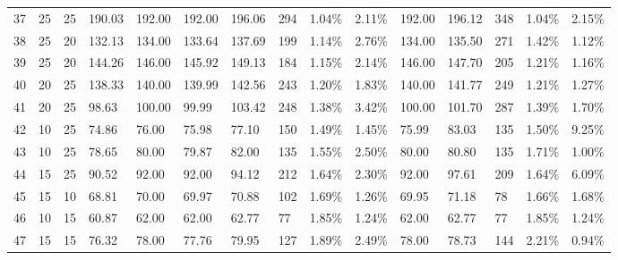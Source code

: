 \documentclass[
  a4paper,
,tablecaptionabove
]{scrartcl}
\begin{document}
\begin{longtable}{l|ll|ll|lllll|lllll}
  37 & 25                         & 25                         & 190.03                    & 192.00      & 192.00        & 196.06 & 294 & 1.04\%  & 2.11\% & 192.00 & 196.12 & 348 & 1.04\%  & 2.15\%  \\
  38 & 25                         & 20                         & 132.13                    & 134.00      & 133.64        & 137.69 & 199 & 1.14\%  & 2.76\% & 134.00 & 135.50 & 271 & 1.42\%  & 1.12\%  \\
  39 & 25                         & 20                         & 144.26                    & 146.00      & 145.92        & 149.13 & 184 & 1.15\%  & 2.14\% & 146.00 & 147.70 & 205 & 1.21\%  & 1.16\%  \\
  40 & 20                         & 25                         & 138.33                    & 140.00      & 139.99        & 142.56 & 243 & 1.20\%  & 1.83\% & 140.00 & 141.77 & 249 & 1.21\%  & 1.27\%  \\
  41 & 20                         & 25                         & 98.63                     & 100.00      & 99.99         & 103.42 & 248 & 1.38\%  & 3.42\% & 100.00 & 101.70 & 287 & 1.39\%  & 1.70\%  \\
  42 & 10                         & 25                         & 74.86                     & 76.00       & 75.98         & 77.10  & 150 & 1.49\%  & 1.45\% & 75.99  & 83.03  & 135 & 1.50\%  & 9.25\%  \\
  43 & 10                         & 25                         & 78.65                     & 80.00       & 79.87         & 82.00  & 135 & 1.55\%  & 2.50\% & 80.00  & 80.80  & 135 & 1.71\%  & 1.00\%  \\
  44 & 15                         & 25                         & 90.52                     & 92.00       & 92.00         & 94.12  & 212 & 1.64\%  & 2.30\% & 92.00  & 97.61  & 209 & 1.64\%  & 6.09\%  \\
  45 & 15                         & 10                         & 68.81                     & 70.00       & 69.97         & 70.88  & 102 & 1.69\%  & 1.26\% & 69.95  & 71.18  & 78  & 1.66\%  & 1.68\%  \\
  46 & 10                         & 15                         & 60.87                     & 62.00       & 62.00         & 62.77  & 77  & 1.85\%  & 1.24\% & 62.00  & 62.77  & 77  & 1.85\%  & 1.24\%  \\
  47 & 15                         & 15                         & 76.32                     & 78.00       & 77.76         & 79.95  & 127 & 1.89\%  & 2.49\% & 78.00  & 78.73  & 144 & 2.21\%  & 0.94\%  \\

\end{longtable}
\end{document}
